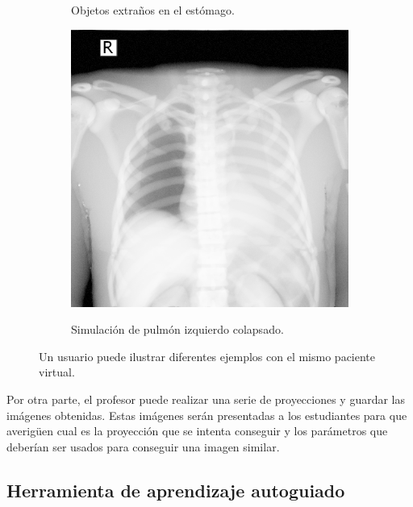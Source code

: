 \begin{figure}[h]
\begin{subfigure}[b]{0.3\linewidth}
        \caption{Objetos extraños en el estómago.}
    \end{subfigure}
    \null\hfill
     \begin{subfigure}[b]{0.3\linewidth}
        \centering
        {\includegraphics[width=\linewidth]{IMG/HVPLung.png}}
        \caption{Simulación de pulmón izquierdo colapsado.}
    \end{subfigure}
    \caption{\label{fig:disease} Un usuario puede ilustrar diferentes ejemplos con el mismo paciente virtual.}
   \end{figure}
   
   
Por otra parte, el profesor puede realizar una serie de proyecciones y guardar las imágenes obtenidas. Estas imágenes serán presentadas a los estudiantes para que averigüen cual es la proyección que se intenta conseguir y los parámetros que deberían ser usados para conseguir una imagen similar.

\subsection{Herramienta de aprendizaje autoguiado}

